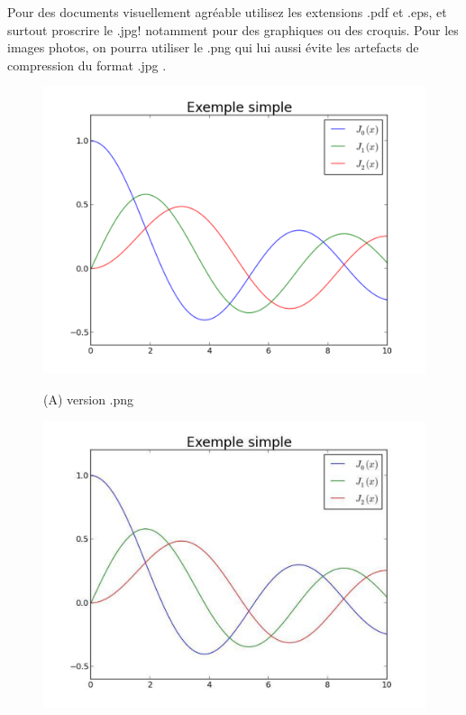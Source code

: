 Pour des documents visuellement agr\'eable utilisez les extensions .pdf et .eps, et surtout proscrire le .jpg!
notamment pour des graphiques ou des croquis. Pour les images photos, on pourra utiliser le .png qui lui aussi
\'evite les artefacts de compression du format .jpg .

\begin{figure}[htb]
\begin{minipage}[b]{0.33\linewidth}
  \centering
 \centerline{\includegraphics[clip,viewport=400 300 520 450,width=1.\textwidth]{example_simple_png}}
  \vspace{0.1cm}
  \centerline{(A) version .png}\medskip
\end{minipage}
\hfill
\begin{minipage}[b]{.33\linewidth}
  \centering
 \centerline{\includegraphics[clip=true,viewport=550 410 727 590,width=1.\textwidth]{example_simple_jpg}}

\end{minipage}
\end{figure}
